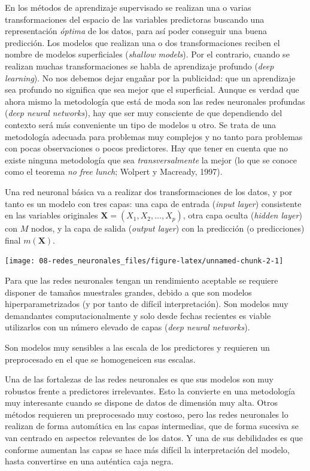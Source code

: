 \documentclass[
]{book}
\theoremstyle{break}
\theoremstyle{definition}
\theoremstyle{definition}
\theoremstyle{definition}
\theoremstyle{definition}
\theoremstyle{remark}
\begin{document}
En los métodos de aprendizaje supervisado se realizan una o varias transformaciones del espacio de las variables predictoras buscando una representación \emph{óptima} de los datos, para así poder conseguir una buena predicción. Los modelos que realizan una o dos transformaciones reciben el nombre de modelos superficiales (\emph{shallow models}). Por el contrario, cuando se realizan muchas transformaciones se habla de aprendizaje profundo (\emph{deep learning}). No nos debemos dejar engañar por la publicidad: que un aprendizaje sea profundo no significa que sea mejor que el superficial. Aunque es verdad que ahora mismo la metodología que está de moda son las redes neuronales profundas (\emph{deep neural networks}), hay que ser muy consciente de que dependiendo del contexto será más conveniente un tipo de modelos u otro. Se trata de una metodología adecuada para problemas muy complejos y no tanto para problemas con pocas observaciones o pocos predictores. Hay que tener en cuenta que no existe ninguna metodología que sea \emph{transversalmente} la mejor (lo que se conoce como el teorema \emph{no free lunch}; Wolpert y Macready, 1997).

Una red neuronal básica va a realizar dos transformaciones de los datos, y por tanto es un modelo con tres capas: una capa de entrada (\emph{input layer}) consistente en las variables originales \(\mathbf{X} = (X_1,X_2,\ldots, X_p)\), otra capa oculta (\emph{hidden layer}) con \(M\) nodos, y la capa de salida (\emph{output layer}) con la predicción (o predicciones) final \(m(\mathbf{X})\).

\begin{center}\texttt{[image: 08-redes\_neuronales\_files/figure-latex/unnamed-chunk-2-1]} \end{center}

Para que las redes neuronales tengan un rendimiento aceptable se requiere disponer de tamaños muestrales grandes, debido a que son modelos hiperparametrizados (y por tanto de difícil interpretación). Son modelos muy demandantes computacionalmente y solo desde fechas recientes es viable utilizarlos con un número elevado de capas (\emph{deep neural networks}).

Son modelos muy sensibles a las escala de los predictores y requieren un preprocesado en el que se homogeneicen sus escalas.

Una de las fortalezas de las redes neuronales es que sus modelos son muy robustos frente a predictores irrelevantes. Esto la convierte en una metodología muy interesante cuando se dispone de datos de dimensión muy alta. Otros métodos requieren un preprocesado muy costoso, pero las redes neuronales lo realizan de forma automática en las capas intermedias, que de forma sucesiva se van centrado en aspectos relevantes de los datos. Y una de sus debilidades es que conforme aumentan las capas se hace más difícil la interpretación del modelo, hasta convertirse en una auténtica caja negra.
\end{document}
